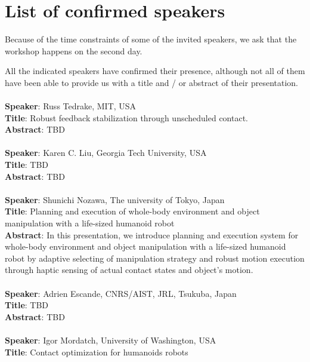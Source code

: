 \documentclass[conference]{IEEEtran}
\begin{document}
\section{List of confirmed speakers}
Because of the time constraints of some of the invited speakers, we ask that the workshop happens on the second day.

All the indicated speakers have confirmed their presence, although not all of them have been able to provide us with a title and / or abstract
of their presentation.\\ \\
\textbf{Speaker}: Russ Tedrake, MIT, USA \\
\textbf{Title}:  Robust feedback stabilization through unscheduled contact.\\
\textbf{Abstract}: TBD \\ \\
\textbf{Speaker}: Karen C. Liu, Georgia Tech University, USA \\
\textbf{Title}:  TBD \\
\textbf{Abstract}: TBD  \\ \\
\textbf{Speaker}: Shunichi Nozawa, The university of Tokyo, Japan \\
\textbf{Title}:  Planning and execution of whole-body environment and object
manipulation with a life-sized humanoid robot \\
\textbf{Abstract}: In this presentation, we introduce planning and execution system for whole-body environment and object manipulation with a life-sized humanoid robot by adaptive selecting of manipulation strategy and robust motion execution through haptic sensing of actual contact states and object's motion. \\ \\
\textbf{Speaker}: Adrien Escande, CNRS/AIST, JRL, Tsukuba, Japan \\
\textbf{Title}: TBD \\ 
\textbf{Abstract}: TBD \\ \\
\textbf{Speaker}: Igor Mordatch, University of Washington, USA \\
\textbf{Title}: Contact optimization for humanoids robots \\
\end{document}
